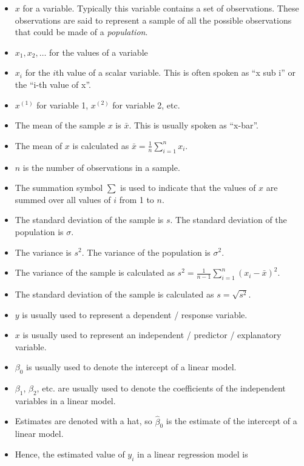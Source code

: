 \documentclass[
  letterpaper,
  8pt,
  a4paper]{book}
\providecommand{\tightlist}{%
  \setlength{\itemsep}{0pt}\setlength{\parskip}{0pt}}
\begin{document}
\begin{itemize}
\tightlist
\item
  \(x\) for a variable. Typically this variable contains a set of
  observations. These observations are said to represent a sample of all
  the possible observations that could be made of a \emph{population}.
\item
  \(x_1, x_2, \ldots\) for the values of a variable
\item
  \(x_i\) for the \(i\)th value of a scalar variable. This is often
  spoken as ``x sub i'' or the ``i-th value of x''.
\item
  \(x^{(1)}\) for variable 1, \(x^{(2)}\) for variable 2, etc.
\item
  The mean of the sample \(x\) is \(\bar{x}\). This is usually spoken as
  ``x-bar''.
\item
  The mean of \(x\) is calculated as
  \(\bar{x} = \frac{1}{n} \sum_{i=1}^n x_i\).
\item
  \(n\) is the number of observations in a sample.
\item
  The summation symbol \(\sum\) is used to indicate that the values of
  \(x\) are summed over all values of \(i\) from 1 to \(n\).
\item
  The standard deviation of the sample is \(s\). The standard deviation
  of the population is \(\sigma\).
\item
  The variance is \(s^2\). The variance of the population is
  \(\sigma^2\).
\item
  The variance of the sample is calculated as
  \(s^2 = \frac{1}{n-1} \sum_{i=1}^n (x_i - \bar{x})^2\).
\item
  The standard deviation of the sample is calculated as
  \(s = \sqrt{s^2}\).
\item
  \(y\) is usually used to represent a dependent / response variable.
\item
  \(x\) is usually used to represent an independent / predictor /
  explanatory variable.
\item
  \(\beta_0\) is usually used to denote the intercept of a linear model.
\item
  \(\beta_1\), \(\beta_2\), etc. are usually used to denote the
  coefficients of the independent variables in a linear model.
\item
  Estimates are denoted with a hat, so \(\hat{\beta}_0\) is the estimate
  of the intercept of a linear model.
\item
  Hence, the estimated value of \(y_i\) in a linear regression model is

\end{itemize}
\end{document}
